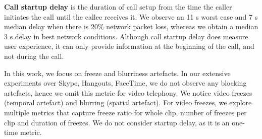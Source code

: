 \noindent \textbf{Call startup delay} is the duration of call setup from the time the caller initiates the call until the callee receives it. 
We observe an 11 s worst case and 7 s median delay when there is 20\% network packet loss, whereas we obtain a median 3 s delay in best network conditions.
Although call startup delay does measure user experience, it can only provide information at the beginning of the call, and not during the call.

In this work, we focus on freeze and blurriness artefacts. In our extensive experiments over Skype, Hangouts, FaceTime, we do not observe any blocking artefacts, hence we omit this metric for video telephony. We notice video freezes (temporal artefact) and blurring (spatial artefact). For video freezes, we  explore multiple metrics that capture freeze ratio for whole clip, number of freezes per clip and duration of freezes. We do not consider startup delay, as it is an one-time metric.
